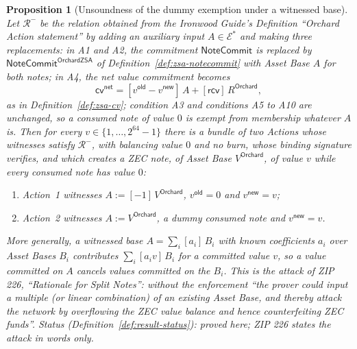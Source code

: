\documentclass[11pt,a4paper]{article}
\newtheorem{proposition}[theorem]{Proposition}
\theoremstyle{definition}
\newcommand{\Rel}{\mathcal{R}}
\newcommand{\cvsym}{\mathsf{cv}}
\newcommand{\Ep}{\ensuremath{\mathcal{E}}}
\newcommand{\NoteCommit}{\ensuremath{\mathsf{NoteCommit}}}
\newcommand{\rcv}{\ensuremath{\mathsf{rcv}}}
\begin{document}
\begin{proposition}[Unsoundness of the dummy exemption under a witnessed
base]\label{prop:dummy-attack}
Let $\Rel^{-}$ be the relation obtained from the \emph{Ironwood Guide}'s
Definition ``Orchard Action statement'' by adding an auxiliary input
$A \in \Ep^{*}$ and making three replacements: in A1 and A2, the
commitment $\NoteCommit$ is replaced by $\NoteCommit^{\mathsf{OrchardZSA}}$
of Definition~\ref{def:zsa-notecommit} with Asset Base $A$ for both notes;
in A4, the net value commitment becomes
\[
  \cvsym^{\mathsf{net}} = [v^{\mathsf{old}} - v^{\mathsf{new}}]\,A
    + [\rcv]\,R^{\mathsf{Orchard}},
\]
as in Definition~\ref{def:zsa-cv}; condition A3 and conditions A5 to A10
are unchanged, so a consumed note of value $0$ is exempt from membership
whatever $A$ is. Then for every $v \in \{1, \dots, 2^{64} - 1\}$ there is a
bundle of two Actions whose witnesses satisfy $\Rel^{-}$, with balancing
value $0$ and no burn, whose binding signature verifies, and which creates a
ZEC note, of Asset Base $V^{\mathsf{Orchard}}$, of value $v$ while every
consumed note has value $0$:
\begin{enumerate}
\item[] Action~1 witnesses $A := [-1]\,V^{\mathsf{Orchard}}$,
  $v^{\mathsf{old}} = 0$ and $v^{\mathsf{new}} = v$;
\item[] Action~2 witnesses $A := V^{\mathsf{Orchard}}$, a dummy consumed
  note and $v^{\mathsf{new}} = v$.
\end{enumerate}
More generally, a witnessed base $A = \sum_i [a_i]\,B_i$ with known
coefficients $a_i$ over Asset Bases $B_i$ contributes
$\sum_i [a_i v]\,B_i$ for a committed value $v$, so a value committed on $A$
cancels values committed on the $B_i$. This is the attack of ZIP 226,
``Rationale for Split Notes'': without the enforcement ``the prover could
input a multiple (or linear combination) of an existing Asset Base, and
thereby attack the network by overflowing the ZEC value balance and hence
counterfeiting ZEC funds''. Status (Definition~\ref{def:result-status}):
proved here; ZIP 226 states the attack in words only.
\end{proposition}
\end{document}
